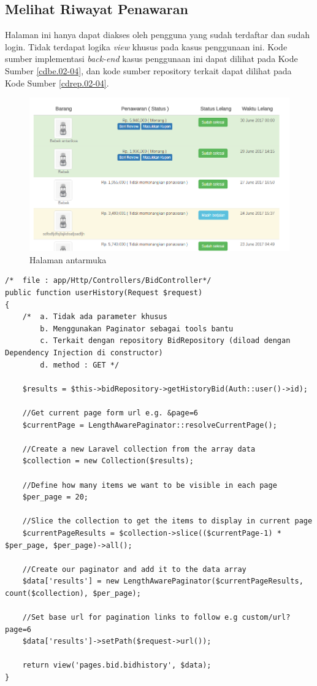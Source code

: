 \subsection{Melihat Riwayat Penawaran}
Halaman ini hanya dapat diakses oleh pengguna yang sudah terdaftar dan sudah login. Tidak terdapat logika \textit{view} khusus pada kasus penggunaan ini. Kode sumber implementasi \textit{back-end} kasus penggunaan ini dapat dilihat pada Kode Sumber \ref{cdbe.02-04}, dan kode sumber repository terkait dapat dilihat pada Kode Sumber \ref{cdrep.02-04}.

\begin{figure}[H]
    \centering
    \includegraphics[width=\textwidth]{images/bab4/ui/02-04.png}
    \caption{Halaman antarmuka }
    \label{ui.02-04}
\end{figure}

\begin{lstlisting}[label=cdbe.02-04,style=php,caption=Kode Sumber \textit{Back-end} Kasus Penggunaan: Melihat Riwayat Penawaran]
/*	file : app/Http/Controllers/BidController*/
public function userHistory(Request $request)
{
    /*  a. Tidak ada parameter khusus
        b. Menggunakan Paginator sebagai tools bantu
        c. Terkait dengan repository BidRepository (diload dengan Dependency Injection di constructor)
        d. method : GET */

    $results = $this->bidRepository->getHistoryBid(Auth::user()->id);
    
    //Get current page form url e.g. &page=6
    $currentPage = LengthAwarePaginator::resolveCurrentPage();

    //Create a new Laravel collection from the array data
    $collection = new Collection($results);

    //Define how many items we want to be visible in each page
    $per_page = 20;

    //Slice the collection to get the items to display in current page
    $currentPageResults = $collection->slice(($currentPage-1) * $per_page, $per_page)->all();

    //Create our paginator and add it to the data array
    $data['results'] = new LengthAwarePaginator($currentPageResults, count($collection), $per_page);

    //Set base url for pagination links to follow e.g custom/url?page=6
    $data['results']->setPath($request->url());

    return view('pages.bid.bidhistory', $data);
}
\end{lstlisting}

